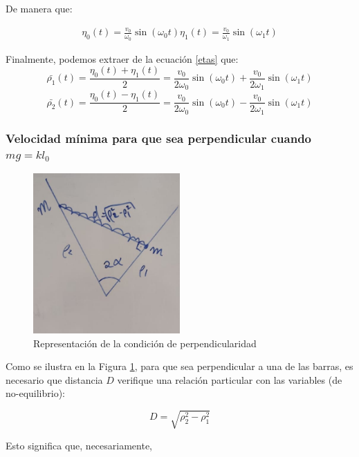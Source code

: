 \documentclass[a4paper,12pt]{article}
\begin{document}
De manera que:

\begin{equation}
  \begin{aligned}
  \eta_0 (t) = \frac{v_0}{\omega_0} \sin(\omega_0 t)
  \eta_1 (t) = \frac{v_0}{\omega_1} \sin(\omega_1 t)
  \end{aligned}
\end{equation}

Finalmente, podemos extraer de la ecuación \eqref{etas} que:
\begin{equation}
  \bar{\rho_1}(t) = \frac{\eta_0 (t) + \eta_1(t)}{2} =\frac{v_0}{2\omega_0} \sin(\omega_0 t) +\frac{v_0}{2\omega_1} \sin(\omega_1 t)
\end{equation}
\begin{equation}
  \bar{\rho_2} (t)= \frac{\eta_0 (t) - \eta_1(t)}{2} =\frac{v_0}{2\omega_0} \sin(\omega_0 t) -\frac{v_0}{2\omega_1} \sin(\omega_1 t)
\end{equation}

\subsubsection*{Velocidad mínima para que sea perpendicular cuando $mg = kl_0$}


\begin{figure}[h]
  \centering
  \caption{Representación de la condición de perpendicularidad}
  \label{perp}
  \includegraphics[width=0.5\textwidth]{perp.jpg}
\end{figure}
Como se ilustra en la Figura \ref{perp}, para que sea perpendicular a una de las barras, es necesario que distancia $D$ verifique una relación particular con las variables (de no-equilibrio):

$$D = \sqrt{\rho_2^2 - \rho_1^2}$$

Esto significa que, necesariamente, 
\end{document}
